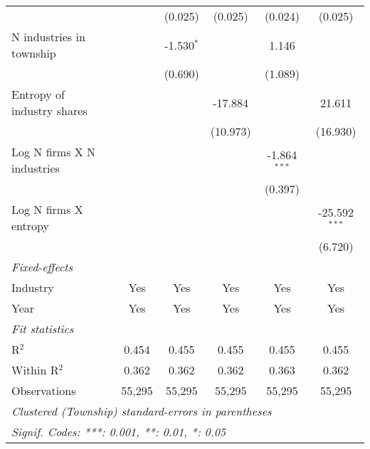 \begin{tabular}{lccccc}
                                             &                  & (0.025)          & (0.025)          & (0.024)          & (0.025)\\   
   N industries in township                  &                  & -1.530$^{*}$     &                  & 1.146            &   \\   
                                             &                  & (0.690)          &                  & (1.089)          &   \\   
   Entropy of industry shares                &                  &                  & -17.884          &                  & 21.611\\   
                                             &                  &                  & (10.973)         &                  & (16.930)\\   
   Log N firms X N industries                &                  &                  &                  & -1.864$^{***}$   &   \\   
                                             &                  &                  &                  & (0.397)          &   \\   
   Log N firms X entropy                     &                  &                  &                  &                  & -25.592$^{***}$\\   
                                             &                  &                  &                  &                  & (6.720)\\   
   \midrule
   \emph{Fixed-effects}\\
   Industry                                  & Yes              & Yes              & Yes              & Yes              & Yes\\  
   Year                                      & Yes              & Yes              & Yes              & Yes              & Yes\\  
   \midrule
   \emph{Fit statistics}\\
   R$^2$                                     & 0.454            & 0.455            & 0.455            & 0.455            & 0.455\\  
   Within R$^2$                              & 0.362            & 0.362            & 0.362            & 0.363            & 0.362\\  
   Observations                              & 55,295           & 55,295           & 55,295           & 55,295           & 55,295\\  
   \midrule \midrule
   \multicolumn{6}{l}{\emph{Clustered (Township) standard-errors in parentheses}}\\
   \multicolumn{6}{l}{\emph{Signif. Codes: ***: 0.001, **: 0.01, *: 0.05}}\\
\end{tabular}
\par\endgroup
